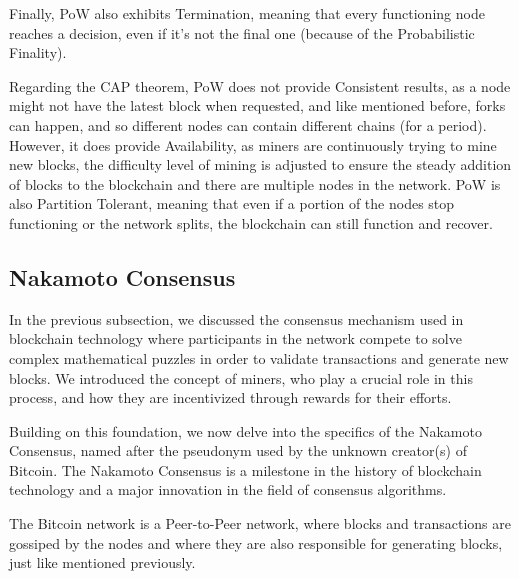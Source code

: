 Finally, PoW also exhibits Termination, meaning that every functioning node reaches a decision, even if it's not the final one (because of the Probabilistic Finality). 

Regarding the CAP theorem, PoW does not provide Consistent results, as a node might not have the latest block when requested, and like mentioned before, forks can happen, and so different nodes can contain different chains (for a period).
However, it does provide Availability, as miners are continuously trying to mine new blocks, the difficulty level of mining is adjusted to ensure the steady addition of blocks to the blockchain and there are multiple nodes in the network.
PoW is also Partition Tolerant, meaning that even if a portion of the nodes stop functioning or the network splits, the blockchain can still function and recover.

\subsection*{Nakamoto Consensus}
In the previous subsection, we discussed the consensus mechanism used in blockchain technology where participants in the network compete to solve complex mathematical puzzles in order to validate transactions and generate new blocks.
We introduced the concept of miners, who play a crucial role in this process, and how they are incentivized through rewards for their efforts.

Building on this foundation, we now delve into the specifics of the Nakamoto Consensus, named after the pseudonym used by the unknown creator(s) of Bitcoin. The Nakamoto Consensus is a milestone in the history of blockchain technology and a major innovation in the field of consensus algorithms.

The Bitcoin network is a Peer-to-Peer network, where blocks and transactions are gossiped by the nodes and where they are also responsible for generating blocks, just like mentioned previously.

